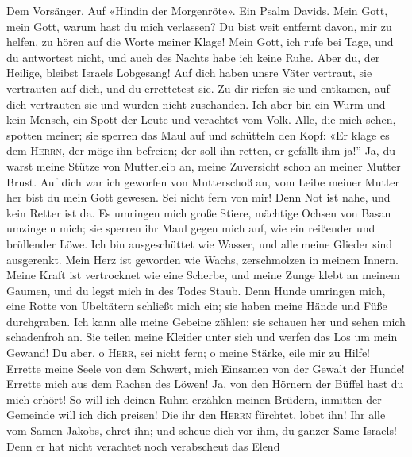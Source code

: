  Dem Vorsänger. Auf «Hindin der Morgenröte». Ein Psalm
Davids. Mein Gott, mein Gott, warum hast du mich verlassen? Du bist weit
entfernt davon, mir zu helfen, zu hören auf die Worte meiner Klage!
 Mein Gott, ich rufe bei Tage, und du antwortest nicht,
und auch des Nachts habe ich keine Ruhe.  Aber du, der
Heilige, bleibst Israels Lobgesang!  Auf dich haben unsre
Väter vertraut, sie vertrauten auf dich, und du errettetest sie.
 Zu dir riefen sie und entkamen, auf dich vertrauten sie
und wurden nicht zuschanden.  Ich aber bin ein Wurm und
kein Mensch, ein Spott der Leute und verachtet vom Volk. 
Alle, die mich sehen, spotten meiner; sie sperren das Maul auf und
schütteln den Kopf:  «Er klage es dem \textsc{Herrn}, der
möge ihn befreien; der soll ihn retten, er gefällt ihm ja!''
 Ja, du warst meine Stütze von Mutterleib an, meine
Zuversicht schon an meiner Mutter Brust.  Auf dich war
ich geworfen von Mutterschoß an, vom Leibe meiner Mutter her bist du
mein Gott gewesen.  Sei nicht fern von mir! Denn Not ist
nahe, und kein Retter ist da.  Es umringen mich große
Stiere, mächtige Ochsen von Basan umzingeln mich;  sie
sperren ihr Maul gegen mich auf, wie ein reißender und brüllender Löwe.
 Ich bin ausgeschüttet wie Wasser, und alle meine Glieder
sind ausgerenkt. Mein Herz ist geworden wie Wachs, zerschmolzen in
meinem Innern.  Meine Kraft ist vertrocknet wie eine
Scherbe, und meine Zunge klebt an meinem Gaumen, und du legst mich in
des Todes Staub.  Denn Hunde umringen mich, eine Rotte
von Übeltätern schließt mich ein; sie haben meine Hände und Füße
durchgraben.  Ich kann alle meine Gebeine zählen; sie
schauen her und sehen mich schadenfroh an.  Sie teilen
meine Kleider unter sich und werfen das Los um mein Gewand!
 Du aber, o \textsc{Herr}, sei nicht fern; o meine
Stärke, eile mir zu Hilfe!  Errette meine Seele von dem
Schwert, mich Einsamen von der Gewalt der Hunde!  Errette
mich aus dem Rachen des Löwen! Ja, von den Hörnern der Büffel hast du
mich erhört!  So will ich deinen Ruhm erzählen meinen
Brüdern, inmitten der Gemeinde will ich dich preisen! 
Die ihr den \textsc{Herrn} fürchtet, lobet ihn! Ihr alle vom Samen
Jakobs, ehret ihn; und scheue dich vor ihm, du ganzer Same Israels!
 Denn er hat nicht verachtet noch verabscheut das Elend
